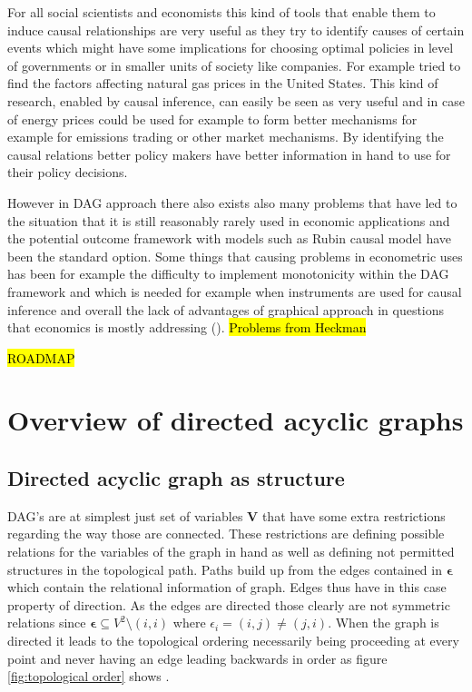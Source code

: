 \documentclass[main=english,12pt,a4paper,pdftex,econ,utf8]{aaltothesis}
\begin{document}
For all social scientists and economists this kind of tools that enable them to induce causal relationships are very useful as they try to identify causes of certain events which might have some implications for choosing optimal policies in level of governments or in smaller units of society like companies. For example \cite{Ji2018} tried to find the factors affecting natural gas prices in the United States. This kind of research, enabled by causal inference, can easily be seen as very useful and in case of energy prices could be used for example to form better mechanisms for example for emissions trading or other market mechanisms. By identifying the causal relations better policy makers have better information in hand to use for their policy decisions. 

However in DAG approach there also exists also many problems that have led to the situation that it is still reasonably rarely used in economic applications and the potential outcome framework with models such as Rubin causal model have been the standard option. Some things that causing problems in econometric uses has been for example the difficulty to implement monotonicity within the DAG framework and which is needed for example when instruments are used for causal inference and overall the lack of advantages of graphical approach in questions that economics is mostly addressing (\cite{Imbens2014}). \hl{Problems from Heckman}

\noindent \hl{ROADMAP}

\section{Overview of directed acyclic graphs}

\subsection{Directed acyclic graph as structure}

DAG's are at simplest just set of variables $\textbf{V}$ that have some extra restrictions regarding the way those are connected. These restrictions are defining possible relations for the variables of the graph in hand as well as defining not permitted structures in the topological path. Paths build up from the edges contained in $\bm{\epsilon}$ which contain the relational information of graph. Edges thus have in this case property of direction. As the edges are directed those clearly are not symmetric relations since $\bm{\epsilon}\subseteq V^2\setminus(i,i)$ where $\epsilon_i=(i,j)\neq(j,i)$. When the graph is directed it leads to the topological ordering necessarily being proceeding at every point and never having an edge leading backwards in order as figure \ref{fig:topological order} shows \cite{Peters2017}. 
\end{document}
